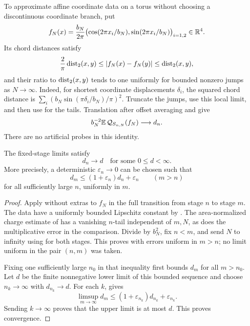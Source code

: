 To approximate affine coordinate data on a torus without choosing a
discontinuous coordinate branch, put
\begin{equation}
 f_N(x)=\frac{b_N}{2\pi}
       \bigl(\cos(2\pi x_i/b_N),\sin(2\pi x_i/b_N)\bigr)_{i=1,2}
       \in\mathbb R^4.
 \label{screen:affine-data}
\end{equation}
Its chord distances satisfy
\begin{equation}
 \frac2\pi\operatorname{dist}_2(x,y)\leq|f_N(x)-f_N(y)|\leq\operatorname{dist}_2(x,y),
 \label{screen:chord-comparison}
\end{equation}
and their ratio to $\operatorname{dist}_2(x,y)$ tends to one uniformly for bounded
nonzero jumps as $N\to\infty$. Indeed, for shortest coordinate
displacements $\delta_i$, the squared chord distance is
$\sum_i(b_N\sin(\pi\delta_i/b_N)/\pi)^2$.
Truncate the jumps, use this local limit, and then use
 for the tails. Translation after offset
averaging and  give
\begin{equation}
 b_N^{-2}\mathbb E\,\mathcal Q_{S_{n,N}}(f_N)\longrightarrow d_n.
 \label{screen:affine-limit}
\end{equation}
There are no artificial probes in this identity.

\begin{proposition}
\label{screen:limit}
The fixed-stage limits satisfy
\begin{equation}
 d_n\longrightarrow d\quad\text{for some }0\leq d<\infty.
 \label{screen:d-limit}
\end{equation}
More precisely, a deterministic $\varepsilon_n\to0$ can be chosen
such that
\begin{equation}
 d_m\leq(1+\varepsilon_n)d_n+\varepsilon_n
             \qquad(m>n)
 \label{screen:almost-monotone}
\end{equation}
for all sufficiently large $n$, uniformly in $m$.
\end{proposition}

\begin{proof}
Apply  without extras to $f_N$ in the full
transition from stage $n$ to stage $m$. The data have a uniformly
bounded Lipschitz constant by .
The area-normalized charge estimate of  has a
vanishing $n$-tail independent of $m,N$, as does the multiplicative
error in the comparison. Divide by $b_N^2$, fix $n<m$, and send
$N$ to infinity using  for both stages.
This proves  with errors uniform in
$m>n$; no limit uniform in the pair $(n,m)$ was taken.

Fixing one sufficiently large $n_0$ in that inequality first bounds
$d_m$ for all $m>n_0$. Let $d$ be the finite nonnegative lower limit
of this bounded sequence and choose $n_k\to\infty$ with
$d_{n_k}\to d$. For each $k$,  gives
\[
 \limsup_{m\to\infty}d_m
    \leq(1+\varepsilon_{n_k})d_{n_k}+\varepsilon_{n_k}.
\]
Sending $k\to\infty$ proves that the upper limit is at most $d$.
This proves convergence.
\end{proof}

